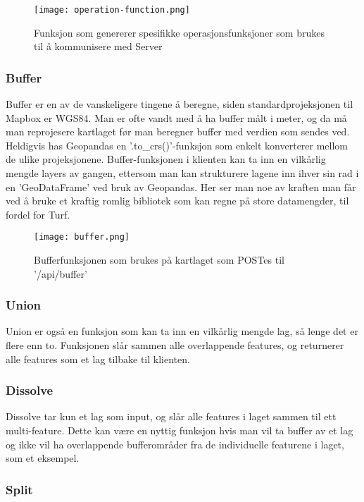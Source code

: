 \begin{figure}[h]
    \center
    \texttt{[image: operation-function.png]}
    \caption{Funksjon som genererer spesifikke operasjonsfunksjoner som brukes til å kommunisere med Server}
    \label{fig:operation}
\end{figure}

\subsubsection{Buffer}

Buffer er en av de vanskeligere tingene å beregne, siden standardprojeksjonen til Mapbox er WGS84. Man er ofte vandt med å ha buffer målt i meter, og da må man reprojesere kartlaget før man beregner buffer med verdien som sendes ved. Heldigvis has Geopandas en '.to\_crs()'-funksjon som enkelt konverterer mellom de ulike projeksjonene. Buffer-funksjonen i klienten kan ta inn en vilkårlig mengde layers av gangen, ettersom man kan strukturere lagene inn ihver sin rad i en 'GeoDataFrame' ved bruk av Geopandas. Her ser man noe av kraften man får ved å bruke et kraftig romlig bibliotek som kan regne på store datamengder, til fordel for Turf. 

\begin{figure}[h]
    \center
    \texttt{[image: buffer.png]}
    \caption{Bufferfunksjonen som brukes på kartlaget som POSTes til '/api/buffer'}
    \label{fig:operation}
\end{figure}

\subsubsection{Union}

Union er også en funksjon som kan ta inn en vilkårlig mengde lag, så lenge det er flere enn to. Funksjonen slår sammen alle overlappende features, og returnerer alle features som et lag tilbake til klienten.  

\subsubsection{Dissolve}

Dissolve tar kun et lag som input, og slår alle features i laget sammen til ett multi-feature. Dette kan være en nyttig funksjon hvis man vil ta buffer av et lag og ikke vil ha overlappende bufferområder fra de individuelle featurene i laget, som et eksempel. 

\subsubsection{Split}

